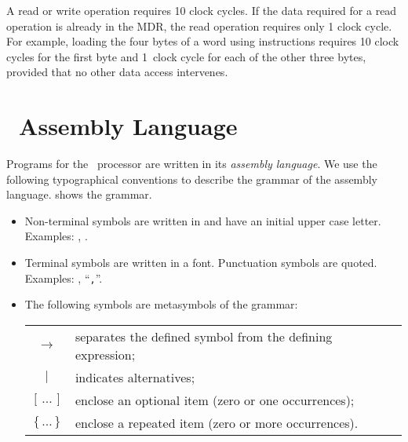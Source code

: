 A read or write operation requires 10 clock cycles. If the data required
for a read operation is already in the MDR, the read operation requires
only 1 clock cycle. For example, loading the four bytes of a word using
 instructions requires 10 clock cycles for the first byte and
1~clock cycle for each of the other three bytes, provided that no other
data access intervenes.


\section{\moon\ Assembly Language} \label{sec:asslan}

Programs for the \moon\ processor are written in its {\it assembly
language\/}. We use the following typographical conventions to describe
the grammar of the assembly language.  shows the grammar.

\begin{itemize}

\item Non-terminal symbols are written in  and have
      an initial upper case letter.
      \linebreak Examples: , .

\item Terminal symbols are written in a  font.
      Punctuation symbols are quoted.
      \linebreak Examples: , ``\verb","''.

\item The following symbols are metasymbols of the grammar:

      \begin{tabular}{cl}
      $\longrightarrow$  & separates the defined symbol from the
                           defining expression; \\
      $|$                & indicates alternatives; \\
      $[ \,\ldots\, ]$   & enclose an optional item (zero or one
                           occurrences); \\
      $\{ \,\ldots\, \}$ & enclose a repeated item (zero or more
                           occurrences). \\
      \end{tabular}

\end{itemize}

